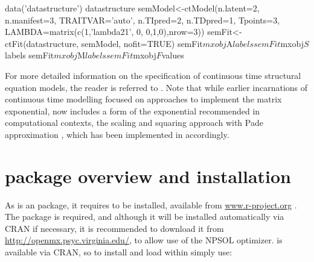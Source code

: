 \documentclass[nojss]{jss}\usepackage[]{graphicx}\usepackage[]{color}
\begin{document}
\begin{Schunk}
\begin{Sinput}
data('datastructure')
datastructure
semModel<-ctModel(n.latent=2, n.manifest=3, TRAITVAR='auto', 
  n.TIpred=2, n.TDpred=1, Tpoints=3, 
  LAMBDA=matrix(c(1,'lambda21', 0, 0,1,0),nrow=3))
semFit<-ctFit(datastructure, semModel, nofit=TRUE)
semFit$mxobj$A$labels
semFit$mxobj$S$labels
semFit$mxobj$M$labels
semFit$mxobj$F$values
\end{Sinput}
\end{Schunk}

% 
% 
% 
% 
For more detailed information on the specification of continuous time structural equation models, the reader is referred to \citet{oud2000continuous, arnold1974stochastic, singer1998continuous, voelkle2012sem}. Note that while earlier incarnations of continuous time modelling focused on approaches to implement the matrix exponential,  now includes a form of the exponential recommended in computational contexts, the scaling and squaring approach with Pade approximation \citep{higham2009scaling}, which has been implemented in  accordingly.

\section[ctsem package overview and installation]{ package overview and installation} \label{sec:ctsemoverview}\nopagebreak
As  is an  package, it requires  to be installed, available from \url{www.r-project.org} \citep{rcoreteam2014r}. 
The  package  \citep{neale2015openmx} is required, and although it will be installed automatically via CRAN if necessary, it is recommended to download it from \url{http://openmx.psyc.virginia.edu/}, to allow use of the NPSOL optimizer. 
 is available via CRAN, so to install and load  within  simply use:
\end{document}
